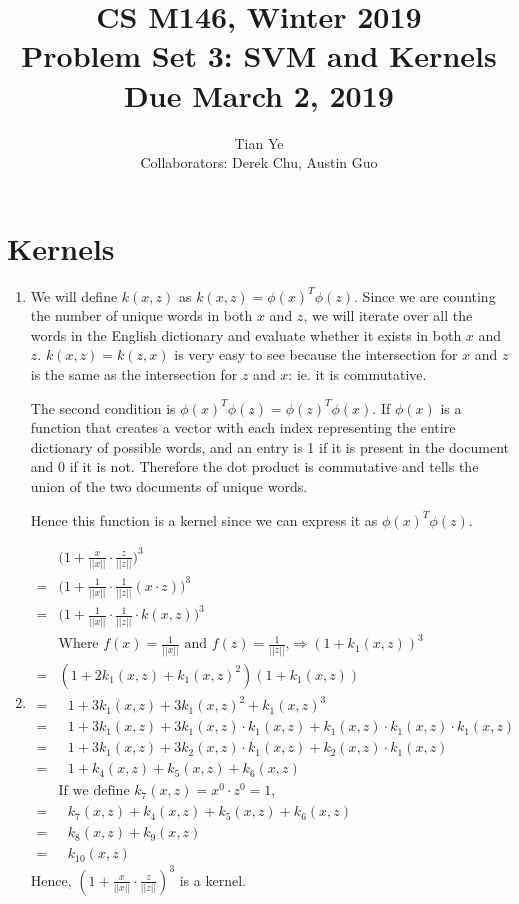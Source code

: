 \documentclass[11pt]{article}
\newcommand{\cnum}{CS M146}
\newcommand{\ced}{Winter 2019}
\newcommand{\ctitle}[3]{\title{\vspace{-0.5in}\cnum, \ced\\Problem Set #1: #2\\Due #3}}
\newcommand{\solution}[1]{{{\color{blue}{\bf Solution:} {#1}}}}
\begin{document}
\ctitle{3}{SVM and Kernels}{March 2, 2019}
\author{Tian Ye \\ \small{Collaborators: Derek Chu, Austin Guo}}
\maketitle

\newpage

\section{Kernels}
\begin{enumerate}
\item 
\solution{
We will define $k(x,z)$ as $k(x,z) = \phi(x)^T\phi(z)$. Since we are counting the number of unique words in both $x$ and $z$, we will iterate over all the words in the English dictionary and evaluate whether it exists in both $x$ and $z$.
$k(x, z) = k(z, x)$ is very easy to see because the intersection for $x$ and $z$ is the same as the intersection for $z$ and $x$: ie. it is commutative.

The second condition is $\phi(x)^T\phi(z) = \phi(z)^T\phi(x)$. If $\phi(x)$ is a function that creates a vector with each index representing the entire dictionary of possible words, and an entry is 1 if it is present in the document and 0 if it is not. Therefore the dot product is commutative and tells the union of the two documents of unique words.

Hence this function is a kernel since we can express it as $\phi(x)^T\phi(z)$.
}
\vspace{1cm}

\item
\solution{
\begin{align}
&\bigg(1 + \frac{x}{||x||}\cdot\frac{z}{||z||}\bigg)^3 \\
= &\bigg(1 + \frac{1}{||x||}\cdot\frac{1}{||z||}(x \cdot z)\bigg)^3  \\
= &\bigg(1 + \frac{1}{||x||}\cdot\frac{1}{||z||}\cdot k(x, z)\bigg)^3 \\
&\text{Where $f(x) = \frac{1}{||x||}$ and $f(z) = \frac{1}{||z||}$,} \Rightarrow (1 + k_1(x, z))^3 \\
= &(1 + 2k_1(x, z) + k_1(x, z)^2) (1 + k_1(x,z)) \\
= &\text{ }1 + 3k_1(x,z) + 3k_1(x, z)^2 + k_1(x,z)^3\\
= &\text{ }1 + 3k_1(x,z) + 3k_1(x,z) \cdot k_1(x,z) + k_1(x,z) \cdot k_1(x,z) \cdot k_1(x,z) \\
= &\text{ }1 + 3k_1(x,z) + 3k_2(x,z) \cdot k_1(x,z) + k_2(x,z) \cdot k_1(x,z) \\
= &\text{ }1 + k_4(x , z) + k_5(x,z) + k_6(x,z) \\
&\text{If we define $k_7(x,z) = x^0 \cdot z^0 = 1$,} \\
= &\text{ }k_7(x,z) + k_4(x,z) + k_5(x,z)+k_6(x,z) \\
= &\text{ }k_8(x,z) + k_9(x,z) \\
= &\text{ }k_{10}(x,z)
\end{align}
Hence, $(1+\tfrac{x}{||x||}\cdot\tfrac{z}{||z||})^3$ is a kernel.
}
\newpage


\end{enumerate}
\end{document}
